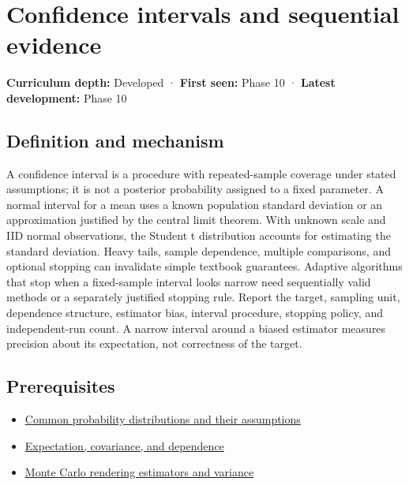 \hypertarget{appendix-c83016554b1e}{}\label{referencestart:appendix-c83016554b1e}
\section{Confidence intervals and sequential evidence}\label{appendix-c83016554b1e-confidence-intervals-and-sequential-evidence}

\textbf{Curriculum depth:} Developed · \textbf{First seen:} Phase 10 · \textbf{Latest development:} Phase 10

\subsection{Definition and mechanism}\label{appendix-c83016554b1e-definition-and-mechanism}

A confidence interval is a procedure with repeated-sample coverage under stated assumptions; it is not a posterior probability assigned to a fixed parameter. A normal interval for a mean uses a known population standard deviation or an approximation justified by the central limit theorem. With unknown scale and IID normal observations, the Student t distribution accounts for estimating the standard deviation. Heavy tails, sample dependence, multiple comparisons, and optional stopping can invalidate simple textbook guarantees. Adaptive algorithms that stop when a fixed-sample interval looks narrow need sequentially valid methods or a separately justified stopping rule. Report the target, sampling unit, dependence structure, estimator bias, interval procedure, stopping policy, and independent-run count. A narrow interval around a biased estimator measures precision about its expectation, not correctness of the target.

\subsection{Prerequisites}\label{appendix-c83016554b1e-prerequisites}

\begin{itemize}
\tightlist
\item
  \hyperref[appendix-a2360b435383]{Common probability distributions and their assumptions}
\item
  \hyperref[appendix-54c383df9992]{Expectation, covariance, and dependence}
\item
  \hyperref[appendix-031e02bf28af]{Monte Carlo rendering estimators and variance}
\end{itemize}

